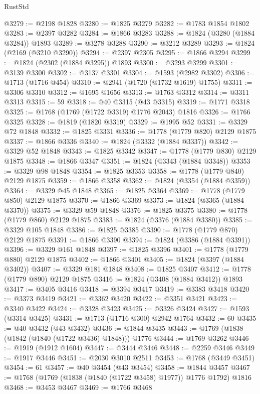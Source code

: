 \begin{lexlean}{RustStd}
\begin{coremodule}
@3279 := @2198 @1828
@3280 := @1825 @3279
@3282 := @1783 @1854 @1802
@3283 := @2397 @3282
@3284 := @1866 @3283
@3288 := @1824 (@3280 (@1884 @3284)) @1893
@3289 := @3278 @3288
@3290 := @3212 @3289
@3293 := @1824 (@2169 (@3210 @3290))
@3294 := @2397 @2305
@3295 := @1866 @3294
@3299 := @1824 (@2302 (@1884 @3295)) @1893
@3300 := @3293 @3299
@3301 := @3139 @3300
@3302 := @3137 @3301
@3304 := @1593 (@2982 @3302)
@3306 := @1713 (@1716 @454)
@3310 := @2941 (@1720 (@1732 @1619) @1755)
@3311 := @3306 @3310
@3312 := @1695 @1656
@3313 := @1763 @3312
@3314 := @3311 @3313
@3315 := 59
@3318 := @40 @3315 (@43 @3315)
@3319 := @1771 @3318
@3325 := @1768 (@1769 (@1722 @3319) @1776 @2043) @1816
@3326 := @1766 @3325
@3328 := @1819 (@1820 @3319)
@3329 := @1995 @52
@3331 := @3329 @72 @1848
@3332 := @1825 @3331
@3336 := @1778 (@1779 @820) @2129 @1875
@3337 := @1866 @3336
@3340 := @1824 (@3332 (@1884 @3337))
@3342 := @3329 @52 @1848
@3343 := @1825 @3342
@3347 := @1778 (@1779 @830) @2129 @1875
@3348 := @1866 @3347
@3351 := @1824 (@3343 (@1884 @3348))
@3353 := @3329 @98 @1848
@3354 := @1825 @3353
@3358 := @1778 (@1779 @840) @2129 @1875
@3359 := @1866 @3358
@3362 := @1824 (@3354 (@1884 @3359))
@3364 := @3329 @45 @1848
@3365 := @1825 @3364
@3369 := @1778 (@1779 @850) @2129 @1875
@3370 := @1866 @3369
@3373 := @1824 (@3365 (@1884 @3370))
@3375 := @3329 @59 @1848
@3376 := @1825 @3375
@3380 := @1778 (@1779 @860) @2129 @1875
@3383 := @1824 (@3376 (@1884 @3380))
@3385 := @3329 @105 @1848
@3386 := @1825 @3385
@3390 := @1778 (@1779 @870) @2129 @1875
@3391 := @1866 @3390
@3394 := @1824 (@3386 (@1884 @3391))
@3396 := @3329 @161 @1848
@3397 := @1825 @3396
@3401 := @1778 (@1779 @880) @2129 @1875
@3402 := @1866 @3401
@3405 := @1824 (@3397 (@1884 @3402))
@3407 := @3329 @181 @1848
@3408 := @1825 @3407
@3412 := @1778 (@1779 @890) @2129 @1875
@3416 := @1824 (@3408 (@1884 @3412)) @1893
@3417 := @3405 @3416
@3418 := @3394 @3417
@3419 := @3383 @3418
@3420 := @3373 @3419
@3421 := @3362 @3420
@3422 := @3351 @3421
@3423 := @3340 @3422
@3424 := @3328 @3423
@3425 := @3326 @3424
@3427 := @1593 (@3314 @3425)
@3431 := @1713 (@1716 @300) @2942 @1764
@3432 := 60
@3435 := @40 @3432 (@43 @3432)
@3436 := @1844 @3435
@3443 := @1769 (@1838 (@1842 (@1840 (@1722 @3436) @1848))) @1776
@3444 := @1769 @3262
@3446 := @1919 (@1912 @1604)
@3447 := @3444 @3446
@3448 := @2259 @3446
@3449 := @1917 @3446
@3451 := @2030 @3010 @2511
@3453 := @1768 (@3449 @3451)
@3454 := 61
@3457 := @40 @3454 (@43 @3454)
@3458 := @1844 @3457
@3467 := @1768 (@1769 (@1838 (@1840 (@1722 @3458) @1977)) @1776 @1792) @1816
@3468 := @3453 @3467
@3469 := @1766 @3468

\end{coremodule}
\end{lexlean}
